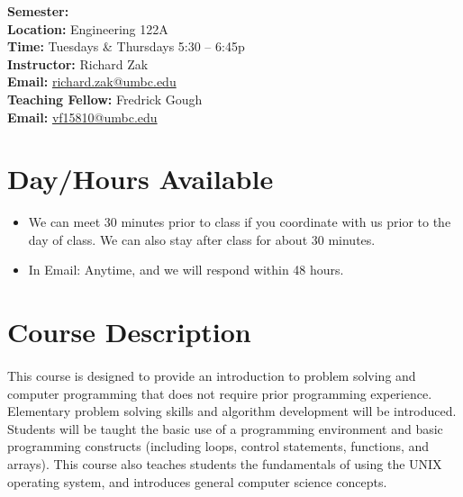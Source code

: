 \documentclass[letter,11pt]{article}
\begin{document}
\textbf{Semester:} \\
\textbf{Location:} Engineering 122A \\
\textbf{Time:} Tuesdays \& Thursdays 5:30 -- 6:45p \\
\textbf{Instructor:} Richard Zak \\
\textbf{Email:} \href{mailto:richard.zak@umbc.edu?Subject=CMSC104}{richard.zak@umbc.edu} \\
\textbf{Teaching Fellow:} Fredrick Gough \\
\textbf{Email:} \href{mailto:vf15810@umbc.edu?Subject=CMSC104}{vf15810@umbc.edu}

\section*{Day/Hours Available}
\begin{itemize}
\item We can meet 30 minutes prior to class if you coordinate with us prior to the day of class. We can also stay after class for about 30 minutes.
\item In Email: Anytime, and we will respond within 48 hours.
\end{itemize}


\section*{Course Description}
\paragraph{}This course is designed to provide an introduction to problem solving and computer programming that does not require prior programming experience. Elementary problem solving skills and algorithm development will be introduced. Students will be taught the basic use of a programming environment and basic programming constructs (including loops, control statements, functions, and arrays). This course also teaches students the fundamentals of using the UNIX operating system, and introduces general computer science concepts.
\end{document}
